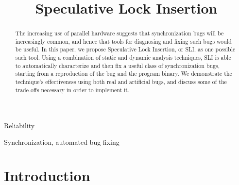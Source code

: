 \documentclass[10pt,twocolumn,preprint,natbib,authoryear]{sigplanconf}
\begin{document}
\copyrightdata{[to be supplied]} 


\title{Speculative Lock Insertion}

\authorinfo{}{}{}

\maketitle

\begin{abstract}

The increasing use of parallel hardware suggests that synchronization
bugs will be increasingly common, and hence that tools for diagnosing
and fixing such bugs would be useful.  In this paper, we propose
Speculative Lock Insertion, or SLI, as one possible such tool.  Using
a combination of static and dynamic analysis techniques, SLI is able
to automatically characterize and then fix a useful class of
synchronization bugs, starting from a reproduction of the bug and the
program binary.  We demonstrate the technique's effectiveness using
both real and artificial bugs, and discuss some of the trade-offs
necessary in order to implement it.

\end{abstract}


\terms
Reliability

\keywords
Synchronization, automated bug-fixing

\section{Introduction}
\end{document}
